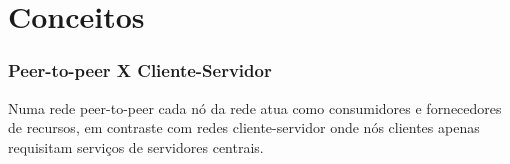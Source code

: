 \documentclass[brazil]{beamer}
\begin{document}
\section{Conceitos}
\begin{frame}
  \frametitle{Peer-to-peer X Cliente-Servidor}
  
    \begin{figure}[h]
    \end{figure}
  
    Numa rede peer-to-peer cada nó da rede atua como consumidores e
    fornecedores de recursos, em contraste com redes cliente-servidor onde nós
    clientes apenas requisitam serviços de servidores centrais.
  
\end{frame}
\end{document}
